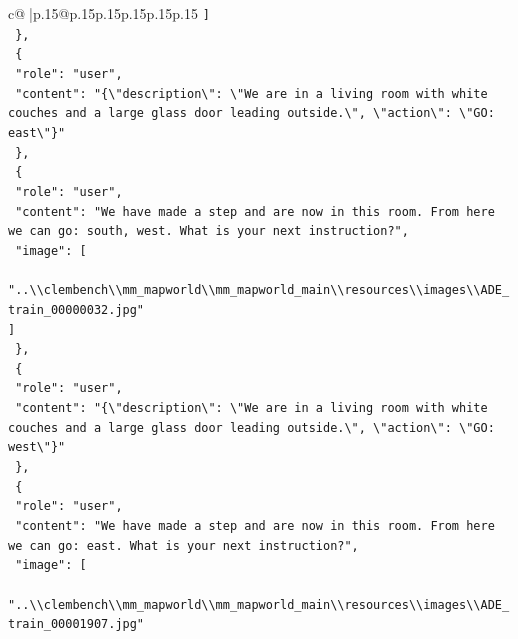 \documentclass{article}
\begin{document}
{\begin{supertabular}{c@{$\;$}|p{.15\linewidth}@{}p{.15\linewidth}p{.15\linewidth}p{.15\linewidth}p{.15\linewidth}p{.15\linewidth}}
{{{\texttt{    {]}} \\
\texttt{  \},} \\
\texttt{  \{} \\
\texttt{    "role": "user",} \\
\texttt{    "content": "\{\textbackslash{}"description\textbackslash{}": \textbackslash{}"We are in a living room with white couches and a large glass door leading outside.\textbackslash{}", \textbackslash{}"action\textbackslash{}": \textbackslash{}"GO: east\textbackslash{}"\}"} \\
\texttt{  \},} \\
\texttt{  \{} \\
\texttt{    "role": "user",} \\
\texttt{    "content": "We have made a step and are now in this room. From here we can go: south, west. What is your next instruction?",} \\
\texttt{    "image": {[}} \\
\texttt{      "..\textbackslash{}\textbackslash{}clembench\textbackslash{}\textbackslash{}mm\_mapworld\textbackslash{}\textbackslash{}mm\_mapworld\_main\textbackslash{}\textbackslash{}resources\textbackslash{}\textbackslash{}images\textbackslash{}\textbackslash{}ADE\_train\_00000032.jpg"} \\
\texttt{    {]}} \\
\texttt{  \},} \\
\texttt{  \{} \\
\texttt{    "role": "user",} \\
\texttt{    "content": "\{\textbackslash{}"description\textbackslash{}": \textbackslash{}"We are in a living room with white couches and a large glass door leading outside.\textbackslash{}", \textbackslash{}"action\textbackslash{}": \textbackslash{}"GO: west\textbackslash{}"\}"} \\
\texttt{  \},} \\
\texttt{  \{} \\
\texttt{    "role": "user",} \\
\texttt{    "content": "We have made a step and are now in this room. From here we can go: east. What is your next instruction?",} \\
\texttt{    "image": {[}} \\
\texttt{      "..\textbackslash{}\textbackslash{}clembench\textbackslash{}\textbackslash{}mm\_mapworld\textbackslash{}\textbackslash{}mm\_mapworld\_main\textbackslash{}\textbackslash{}resources\textbackslash{}\textbackslash{}images\textbackslash{}\textbackslash{}ADE\_train\_00001907.jpg"} \\
}}}
\end{supertabular}}
\end{document}
